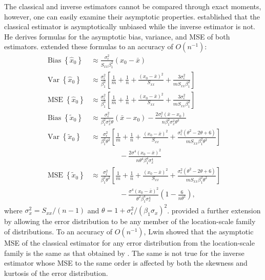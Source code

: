 \documentclass[cmfont,usenames,dvipsnames,leqno]{afit-etd}\usepackage[]{graphicx}\usepackage[]{color}
\newcommand{\newln}{\\&\quad\quad\quad\quad{}}
\newcommand{\wh}[1]{\ensuremath{\widehat{#1}}}
\newcommand{\wt}[1]{\ensuremath{\widetilde{#1}}}
\newcommand{\var}{\operatorname{Var}}
\newcommand{\bias}{\operatorname{Bias}}
\newcommand{\MSE}{\operatorname{MSE}}
\begin{document}
The classical and inverse estimators cannot be compared through exact moments, however, one can easily examine their asymptotic properties. \citet{berkson_estimation_1969} established that the classical estimator is asymptotically unbiased while the inverse estimator is not. He derives formulas for the asymptotic bias, variance, and \ac{MSE} of both estimators. \citet{shukla_problem_1972} extended these formulas to an accuracy of $O(n^{-1})$:
\begin{align*}
  \bias\left\{\wh{x}_0\right\} &\approx \frac{\sigma_\epsilon^2}{S_{xx}\beta_1^2}(x_0 - \bar{x}) \\
  \var\left\{\wh{x}_0\right\} &\approx \frac{\sigma_\epsilon^2}{\beta_1^2}\left[ \frac{1}{m} + \frac{1}{n} + \frac{(x_0 - \bar{x})^2}{S_{xx}} + \frac{3\sigma_\epsilon^2}{m S_{xx} \beta_1^2} \right] \\
  \MSE\left\{\wh{x}_0\right\} &\approx \frac{\sigma_\epsilon^2}{\beta_1^3}\left[ \frac{1}{m} + \frac{1}{n} + \frac{(x_0 - \bar{x})^2}{S_{xx}} + \frac{3\sigma_\epsilon^2}{m S_{xx} \beta_1^2} \right] \\
  \bias\left\{\wt{x}_0\right\} &\approx \frac{\sigma_\epsilon^2}{\beta_1^2\sigma_x^2\theta}(\bar{x}-x_0) - \frac{2\sigma_\epsilon^2(\bar{x}-x_0)}{n\beta_1^2\sigma_x^2\theta^3} \\
  \var\left\{\wt{x}_0\right\} &\approx \frac{\sigma_\epsilon^2}{\beta_1^2\theta^2}\left[ \frac{1}{m} + \frac{1}{n} + \frac{(x_0 - \bar{x})^2}{S_{xx}} + \frac{\sigma_\epsilon^2(\theta^2-2\theta+6)}{m S_{xx}\beta_1^2\theta^2} \right] \newln - \frac{2\sigma^4(x_0-\bar{x})^2}{n\theta^4\beta_1^4\sigma_x^4} \\
  \MSE\left\{\wt{x}_0\right\} &\approx \frac{\sigma_\epsilon^2}{\beta_1^2\theta^2}\left[ \frac{1}{m} + \frac{1}{n} + \frac{(x_0 - \bar{x})^2}{S_{xx}} + \frac{\sigma_\epsilon^2(\theta^2-2\theta+6)}{m S_{xx}\beta_1^2\theta^2} \right] \newln - \frac{\sigma^4(x_0-\bar{x})^2}{\theta^2\beta_1^4\sigma_x^4}\left(1-\frac{6}{n\theta^2}\right),
\end{align*}
where $\sigma_x^2 = S_{xx}/(n-1)$ and $\theta = 1 + \sigma_\epsilon^2/(\beta_1\sigma_x)^2$. \citet{lwin_discussion_1981} provided a further extension by allowing the error distribution to be any member of the location-scale family of distributions. To an accuracy of $O(n^{-1})$, Lwin showed that the asymptotic \ac{MSE} of the classical estimator for any error distribution from the location-scale family is the same as that obtained by \citet{shukla_problem_1972}. The same is not true for the inverse estimator whose \ac{MSE} to the same order is affected by both the skewness and kurtosis of the error distribution.
\end{document}
